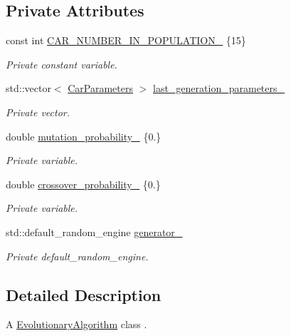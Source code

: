 \subsection*{Private Attributes}
\begin{DoxyCompactItemize}
\item 
const int \hyperlink{classEvolutionaryAlgorithm_af466ca42d5d03e212df4575f263f3a8c}{C\+A\+R\+\_\+\+N\+U\+M\+B\+E\+R\+\_\+\+I\+N\+\_\+\+P\+O\+P\+U\+L\+A\+T\+I\+O\+N\+\_\+} \{15\}
\begin{DoxyCompactList}\small\item\em Private constant variable. \end{DoxyCompactList}\item 
std\+::vector$<$ \hyperlink{classCarParameters}{Car\+Parameters} $>$ \hyperlink{classEvolutionaryAlgorithm_a85d23b07f2b2c8b1df581a9566111fa7}{last\+\_\+generation\+\_\+parameters\+\_\+}
\begin{DoxyCompactList}\small\item\em Private vector. \end{DoxyCompactList}\item 
double \hyperlink{classEvolutionaryAlgorithm_ab847e49664c7b97e1e55963e6f33b332}{mutation\+\_\+probability\+\_\+} \{0.\}
\begin{DoxyCompactList}\small\item\em Private variable. \end{DoxyCompactList}\item 
double \hyperlink{classEvolutionaryAlgorithm_a815be8b2644e2d1bdc6378c88ab03da3}{crossover\+\_\+probability\+\_\+} \{0.\}
\begin{DoxyCompactList}\small\item\em Private variable. \end{DoxyCompactList}\item 
std\+::default\+\_\+random\+\_\+engine \hyperlink{classEvolutionaryAlgorithm_adbd823d385ad95bf20496fd2fc25ccde}{generator\+\_\+}
\begin{DoxyCompactList}\small\item\em Private default\+\_\+random\+\_\+engine. \end{DoxyCompactList}\end{DoxyCompactItemize}


\subsection{Detailed Description}
A \hyperlink{classEvolutionaryAlgorithm}{Evolutionary\+Algorithm} class . 

